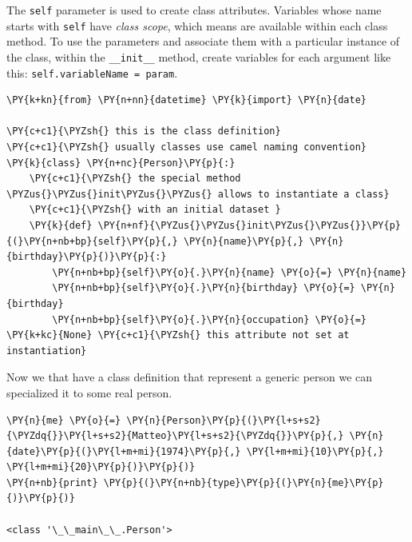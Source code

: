 The \texttt{self} parameter is used to create class attributes. Variables
whose name starts with \texttt{self} have \emph{class scope}, which means are
available within each class method. To use the parameters and
associate them with a particular instance of the class, within the
\texttt{\_\_init\_\_} method, create variables for each argument like
this: \texttt{self.variableName\ =\ param}.

\begin{tcolorbox}[breakable, size=fbox, boxrule=1pt, pad at break*=1mm,colback=cellbackground, colframe=cellborder]
\begin{Verbatim}[commandchars=\\\{\}]
\PY{k+kn}{from} \PY{n+nn}{datetime} \PY{k}{import} \PY{n}{date}

\PY{c+c1}{\PYZsh{} this is the class definition}
\PY{c+c1}{\PYZsh{} usually classes use camel naming convention}
\PY{k}{class} \PY{n+nc}{Person}\PY{p}{:}
    \PY{c+c1}{\PYZsh{} the special method \PYZus{}\PYZus{}init\PYZus{}\PYZus{} allows to instantiate a class}
    \PY{c+c1}{\PYZsh{} with an initial dataset }
    \PY{k}{def} \PY{n+nf}{\PYZus{}\PYZus{}init\PYZus{}\PYZus{}}\PY{p}{(}\PY{n+nb+bp}{self}\PY{p}{,} \PY{n}{name}\PY{p}{,} \PY{n}{birthday}\PY{p}{)}\PY{p}{:}
        \PY{n+nb+bp}{self}\PY{o}{.}\PY{n}{name} \PY{o}{=} \PY{n}{name}
        \PY{n+nb+bp}{self}\PY{o}{.}\PY{n}{birthday} \PY{o}{=} \PY{n}{birthday}     
        \PY{n+nb+bp}{self}\PY{o}{.}\PY{n}{occupation} \PY{o}{=} \PY{k+kc}{None} \PY{c+c1}{\PYZsh{} this attribute not set at instantiation}
\end{Verbatim}
\end{tcolorbox}

Now we that have a class definition that represent a generic person we can 
specialized it to some real person.

\begin{tcolorbox}[breakable, size=fbox, boxrule=1pt, pad at break*=1mm,colback=cellbackground, colframe=cellborder]
\begin{Verbatim}[commandchars=\\\{\}]
\PY{n}{me} \PY{o}{=} \PY{n}{Person}\PY{p}{(}\PY{l+s+s2}{\PYZdq{}}\PY{l+s+s2}{Matteo}\PY{l+s+s2}{\PYZdq{}}\PY{p}{,} \PY{n}{date}\PY{p}{(}\PY{l+m+mi}{1974}\PY{p}{,} \PY{l+m+mi}{10}\PY{p}{,} \PY{l+m+mi}{20}\PY{p}{)}\PY{p}{)}
\PY{n+nb}{print} \PY{p}{(}\PY{n+nb}{type}\PY{p}{(}\PY{n}{me}\PY{p}{)}\PY{p}{)}

<class '\_\_main\_\_.Person'>
\end{Verbatim}
\end{tcolorbox}

